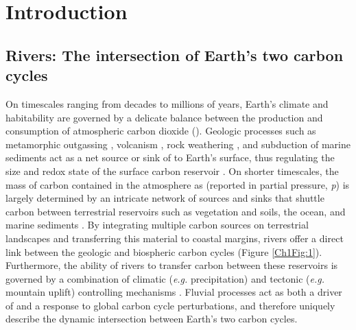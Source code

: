 \chapter{Introduction}
\label{Ch1}
\raggedbottom
\clearpage

\section{Rivers: The intersection of Earth's two carbon cycles}

On timescales ranging from decades to millions of years, Earth's climate and habitability are governed by a delicate balance between the production and consumption of atmospheric carbon dioxide (). Geologic processes such as metamorphic outgassing \citep{Becker:2008bd}, volcanism \citep{Marty:1998vo}, rock weathering \citep{Walker:1981wn}, and subduction of marine sediments \citep{Kelemen:2015ec} act as a net source or sink of  to Earth's surface, thus regulating the size and redox state of the surface carbon reservoir \citep{Hayes:2006ca}. On shorter timescales, the mass of carbon contained in the atmosphere as  (reported in partial pressure, \textit{p}) is largely determined by an intricate network of sources and sinks that shuttle carbon between terrestrial reservoirs such as vegetation and soils, the ocean, and marine sediments \citep[collectively termed the "biosphere";][]{Sarmiento:2006wz}. By integrating multiple carbon sources on terrestrial landscapes and transferring this material to coastal margins, rivers offer a direct link between the geologic and biospheric carbon cycles (Figure \ref{Ch1Fig:1}). Furthermore, the ability of rivers to transfer carbon between these reservoirs is governed by a combination of climatic (\textit{e.g.} precipitation) and tectonic (\textit{e.g.} mountain uplift) controlling mechanisms \citep{Molnar:1990um}. Fluvial processes act as both a driver of and a response to global carbon cycle perturbations, and therefore uniquely describe the dynamic intersection between Earth's two carbon cycles.

